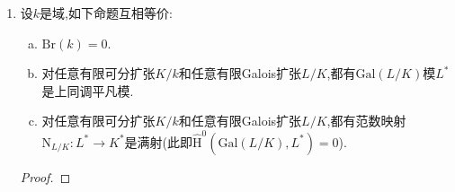 \begin{enumerate}
\begin{enumerate}[(1)]
\begin{proof}
			$\mathrm{Br}(n,K/k)$中的元对应于$K$上的张量$(V,x)$,其中$V$是$n^2$维线性空间,$x$是一个$(1,2)$型张量,并且$(V,x)$是$K$同构于$\mathrm{M}(n,K)$,其中$x$对应于矩阵环$\mathrm{M}(n,K)$上的乘法,而$\mathrm{M}(n,K)$的自同构群是$\mathrm{M}(n,K)$本身,从而$\mathrm{M}(n,K)$上的$K$自同构群就是$\mathrm{M}(n,K)/K^*=\mathrm{PGL}(n,K)$.于是按照张量等价类和一阶上同调的描述,就有该同构.
		\end{proof}
	    \item 考虑短正合列$1\to K^*\to\mathrm{GL}(n,K)\to\mathrm{PGL}(n,K)\to1$,它诱导了上同调群的边界同态:
	    $$\Delta_n:\mathrm{H}^1(G,\mathrm{PGL}(n,K))\to\mathrm{H}^2(G,K^*)$$
	    复合上之前的$\theta$得到同态:
	    $$\delta_n:\mathrm{Br}(n,K/k)\to\mathrm{H}^2(G,K^*)=\mathrm{H}^2(K/k)$$
	    如果$A\in\mathrm{Br}(n,K/k)$和$B\in\mathrm{Br}(m,K/k)$,那么有:
	    $$\delta_{mn}(A\otimes B)=\delta_n(A)+\delta_m(B)$$
	    进而定义了群同态:
	    $$\delta:\mathrm{Br}(K/k)\to\mathrm{H}^2(K/k)$$
	    我们断言这是函子性的群同构.
	    \begin{proof}
	    	\begin{itemize}
	    		\item 单射:我们有非阿贝尔的群上同调长正合列:
	    		$$\xymatrix{1\ar@{=}[r]&\mathrm{H}^1(G,\mathrm{GL}(n,K))\ar[r]&\mathrm{H}^1(G,\mathrm{PGL}(n,K))\ar[r]^{\Delta_n}&\mathrm{H}^2(G,K^*)}$$
	    		于是$\delta_n(A)=0$等价于$\theta(A)=0$,等价于$A$是$k$上的矩阵代数.
	    		\item 满射:我们断言如果$[K:k]=n$,那么就有$\delta_n:\mathrm{Br}(n,K/k)\to\mathrm{H}^2(K/k)$是满射.按照$\delta=\Delta_n\circ\theta$,并且$\theta$是双射,归结为证明$\Delta_n$是满射.换句话讲,对任意取值在$K^*$的2-余圈$a_{s,t}$,都可以表示为$a_{s,t}=p_ss(p_t)p_{st}^{-1}$,其中$p_s\in\mathrm{GL}(n,K)$.为此取$V$是域$K$上的线性空间,以$\{e_s\mid s\in G\}$为一组基.取$p_s\in\mathrm{Hom}_K(V,V)$为把$e_t$映为$a_{s,t}e_{st}$,于是有:
	    		\begin{align*}
	    			p_ss(p_t)(p_t)(e_u)&=a_{s,tu}s(a_{t,u})e_{stu}\\&=a_{s,t}a_{st,u}e_{stu}\\&=a_{s,t}p_{st}(e_u)
	    		\end{align*}
	    	\end{itemize}
	    \end{proof}
	\end{enumerate}
    \item 设$k$是域,如下命题互相等价:
    \begin{enumerate}[(a)]
    	\item $\mathrm{Br}(k)=0$.
    	\item 对任意有限可分扩张$K/k$和任意有限Galois扩张$L/K$,都有$\mathrm{Gal}(L/K)$模$L^*$是上同调平凡模.
    	\item 对任意有限可分扩张$K/k$和任意有限Galois扩张$L/K$,都有范数映射$\mathrm{N}_{L/K}:L^*\to K^*$是满射(此即$\widehat{\mathrm{H}}^0(\mathrm{Gal}(L/K),L^*)=0$).
    \end{enumerate}
    \begin{proof}
    	

\end{proof}
\end{enumerate}
